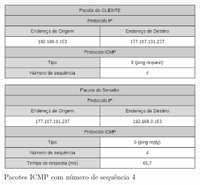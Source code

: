     \begin{figure}[h]
      \centering
      \includegraphics[width=0.9\textwidth]{figuras/pkg_icmp_seq_4.eps}
      \caption{Pacotes ICMP com número de sequência 4}
      \label{fig:pkg_icmp_seq_4}
    \end{figure}
